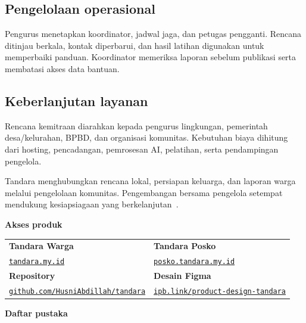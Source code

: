 \documentclass[10pt,a4paper]{article}
\begin{document}
\begin{minipage}[t]{.48\linewidth}\vspace{0pt}\raggedright
\subsection*{Pengelolaan operasional}
Pengurus menetapkan koordinator, jadwal jaga, dan petugas pengganti. Rencana ditinjau berkala, kontak diperbarui, dan hasil latihan digunakan untuk memperbaiki panduan. Koordinator memeriksa laporan sebelum publikasi serta membatasi akses data bantuan.
\end{minipage}\hfill
\begin{minipage}[t]{.48\linewidth}\vspace{0pt}\raggedright
\subsection*{Keberlanjutan layanan}
Rencana kemitraan diarahkan kepada pengurus lingkungan, pemerintah desa/kelurahan, BPBD, dan organisasi komunitas. Kebutuhan biaya dihitung dari hosting, pencadangan, pemrosesan AI, pelatihan, serta pendampingan pengelola.
\end{minipage}
\newpage

Tandara menghubungkan rencana lokal, persiapan keluarga, dan laporan warga melalui pengelolaan komunitas. Pengembangan bersama pengelola setempat mendukung kesiapsiagaan yang berkelanjutan~\cite{uu24}.

\begin{WhiteBox}[top=2mm,bottom=2mm]
\textbf{Akses produk}\par\vspace{1mm}
{\fontsize{9}{12}\selectfont
\begin{tabularx}{\linewidth}{@{}YY@{}}
\textbf{Tandara Warga} & \textbf{Tandara Posko}\\
\href{https://tandara.my.id/}{\nolinkurl{tandara.my.id}} & \href{https://posko.tandara.my.id/}{\nolinkurl{posko.tandara.my.id}}\\
\addlinespace[1.5mm]
\textbf{Repository} & \textbf{Desain Figma}\\
\href{https://github.com/HusniAbdillah/tandara}{\nolinkurl{github.com/HusniAbdillah/tandara}} & \href{https://ipb.link/product-design-tandara}{\nolinkurl{ipb.link/product-design-tandara}}\\
\end{tabularx}}
\end{WhiteBox}

\vspace{1mm}
{\color{Teal}\bfseries\fontsize{13}{16}\selectfont Daftar pustaka}\par
\begin{multicols}{2}
\printbibliography[heading=none]
\end{multicols}
\end{document}
